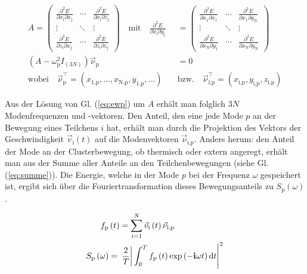\documentclass[numbers=noenddot,a4paper]{scrartcl}
\newcommand{\diff}{\textnormal{d}}
\newcommand{\ix}[1]{_\text{#1}}
\newcommand{\imag}{\mathbf{i}}
\begin{document}
						\begin{align}
							A=
							\begin{pmatrix}
							\frac{\partial^2 E}{\partial x\ix{i} \partial x\ix{j}} & \cdots & \frac{\partial^2 E}{\partial x\ix{i} \partial z\ix{j}} \\ 
							\vdots & \ddots & \vdots \\ 
							\frac{\partial^2 E}{\partial z\ix{i} \partial x\ix{j}} & \cdots & \frac{\partial^2 E}{\partial z\ix{i} \partial z\ix{j}}
							\end{pmatrix} 
							\quad \text{mit} \quad \frac{\partial^2 E}{\partial x\ix{i}\partial y\ix{j}}&=
							\begin{pmatrix}
							\frac{\partial^2 E}{\partial x\ix{1} \partial x\ix{1}} & \cdots & \frac{\partial^2 E}{\partial x\ix{1} \partial y\ix{N}} \\ 
							\vdots & \ddots & \vdots \\ 
							\frac{\partial^2 E}{\partial x\ix{N} \partial y\ix{1}} & \cdots & \frac{\partial^2 E}{\partial x\ix{N} \partial y\ix{N}}
							\end{pmatrix}
							\label{eq:matrix} \\
							\left(A-\omega\ix{p}^2I_{(3N)}\right)\vec{\nu}\ix{p}&=0 \label{eq:ewp} \\ 
							\text{wobei} \quad \vec{\nu}\ix{p}^\top=\left(x\ix{1,p},\dots,x\ix{N,p},y\ix{1,p},\dots\right) \quad &\text{bzw.} \quad \vec{\nu}\ix{i,p}^\top=\left(x\ix{i,p},y\ix{i,p},z\ix{i,p}\right) \nonumber
						\end{align}

					Aus der Lösung von Gl. (\ref{eq:ewp}) um $A$ erhält man folglich $3N$ Modenfrequenzen und -vektoren. Den Anteil, den eine jede Mode $p$ an der Bewegung eines Teilchens $i$ hat, erhält man durch die Projektion des Vektors der Geschwindigkeit $\vec{v}\ix{i}\left(t\right)$ auf die Modenvektoren $\vec{\nu}\ix{i,p}$. Anders herum: den Anteil der Mode an der Clusterbewegung, ob thermisch oder extern angeregt, erhält man aus der Summe aller Anteile an den Teilchenbewegungen (siehe Gl. (\ref{eq:summe})). Die Energie, welche in der Mode $p$ bei der Frequenz $\omega$ gespeichert ist, ergibt sich über die Fouriertransformation dieses Bewegungsanteils zu $S\ix{p}\left(\omega\right)$.

						\begin{align}
							f\ix{p}&\left(t\right)=\sum_{i=1}^{N}\vec{v}\ix{i}\left(t\right)\vec{\nu}\ix{i,p} \label{eq:summe} \\
							S\ix{p}\left(\omega\right)&=\left.\left.\frac{2}{T}\right|\int_{0}^{T}f\ix{p}\left(t\right)\exp\left(-\imag\omega t\right)\diff t\right|^2 \label{eq:energiedicht}
						\end{align}
\end{document}
